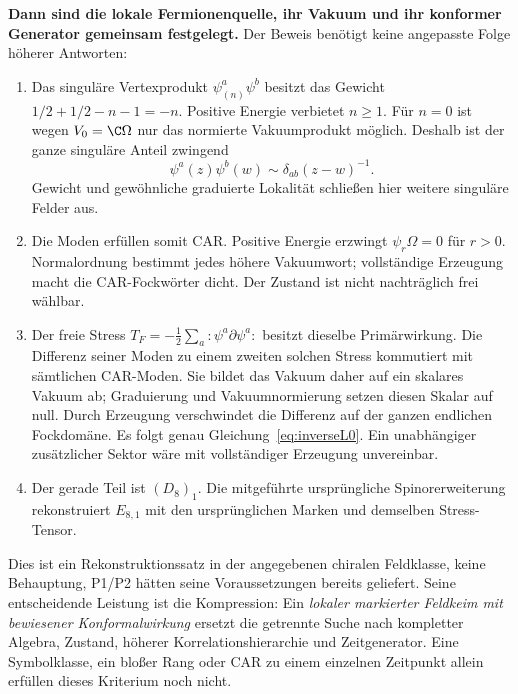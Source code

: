 \textbf{Dann sind die lokale Fermionenquelle, ihr Vakuum und ihr konformer Generator gemeinsam festgelegt.} Der Beweis benötigt keine angepasste Folge höherer Antworten:
\begin{enumerate}
\item Das singuläre Vertexprodukt $\psi^a_{(n)}\psi^b$ besitzt das Gewicht $1/2+1/2-n-1=-n$. Positive Energie verbietet $n\ge1$. Für $n=0$ ist wegen $V_0=\C\Omega$ nur das normierte Vakuumprodukt möglich. Deshalb ist der ganze singuläre Anteil zwingend
\begin{equation}
\psi^a(z)\psi^b(w)\sim\delta_{ab}(z-w)^{-1}.
\end{equation}
Gewicht und gewöhnliche graduierte Lokalität schließen hier weitere singuläre Felder aus.
\item Die Moden erfüllen somit CAR. Positive Energie erzwingt $\psi_r\Omega=0$ für $r>0$. Normalordnung bestimmt jedes höhere Vakuumwort; vollständige Erzeugung macht die CAR-Fockwörter dicht. Der Zustand ist nicht nachträglich frei wählbar.
\item Der freie Stress $T_F=-\frac12\sum_a:\psi^a\partial\psi^a:$ besitzt dieselbe Primärwirkung. Die Differenz seiner Moden zu einem zweiten solchen Stress kommutiert mit sämtlichen CAR-Moden. Sie bildet das Vakuum daher auf ein skalares Vakuum ab; Graduierung und Vakuumnormierung setzen diesen Skalar auf null. Durch Erzeugung verschwindet die Differenz auf der ganzen endlichen Fockdomäne. Es folgt genau Gleichung~\eqref{eq:inverseL0}. Ein unabhängiger zusätzlicher Sektor wäre mit vollständiger Erzeugung unvereinbar.
\item Der gerade Teil ist $(D_8)_1$. Die mitgeführte ursprüngliche Spinorerweiterung rekonstruiert $E_{8,1}$ mit den ursprünglichen Marken und demselben Stress-Tensor.
\end{enumerate}
Dies ist ein Rekonstruktionssatz in der angegebenen chiralen Feldklasse, keine Behauptung, P1/P2 hätten seine Voraussetzungen bereits geliefert. Seine entscheidende Leistung ist die Kompression: Ein \emph{lokaler markierter Feldkeim mit bewiesener Konformalwirkung} ersetzt die getrennte Suche nach kompletter Algebra, Zustand, höherer Korrelationshierarchie und Zeitgenerator. Eine Symbolklasse, ein bloßer Rang oder CAR zu einem einzelnen Zeitpunkt allein erfüllen dieses Kriterium noch nicht.

